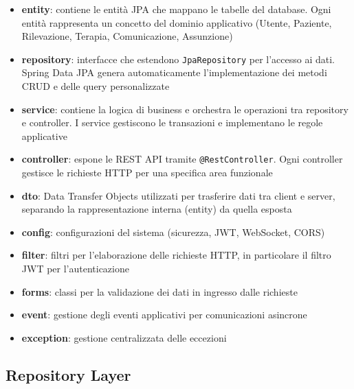 \documentclass{report}
\begin{document}
\begin{itemize}
    \item \textbf{entity}: contiene le entità JPA che mappano le tabelle del database. 
    Ogni entità rappresenta un concetto del dominio applicativo (Utente, Paziente, 
    Rilevazione, Terapia, Comunicazione, Assunzione)
    
    \item \textbf{repository}: interfacce che estendono \texttt{JpaRepository} per 
    l'accesso ai dati. Spring Data JPA genera automaticamente l'implementazione dei 
    metodi CRUD e delle query personalizzate
    
    \item \textbf{service}: contiene la logica di business e orchestra le operazioni 
    tra repository e controller. I service gestiscono le transazioni e implementano 
    le regole applicative
    
    \item \textbf{controller}: espone le REST API tramite \texttt{@RestController}. 
    Ogni controller gestisce le richieste HTTP per una specifica area funzionale
    
    \item \textbf{dto}: Data Transfer Objects utilizzati per trasferire dati tra 
    client e server, separando la rappresentazione interna (entity) da quella esposta
    
    \item \textbf{config}: configurazioni del sistema (sicurezza, JWT, WebSocket, CORS)
    
    \item \textbf{filter}: filtri per l'elaborazione delle richieste HTTP, in particolare 
    il filtro JWT per l'autenticazione
    
    \item \textbf{forms}: classi per la validazione dei dati in ingresso dalle richieste
    
    \item \textbf{event}: gestione degli eventi applicativi per comunicazioni asincrone
    
    \item \textbf{exception}: gestione centralizzata delle eccezioni
\end{itemize}


\subsection{Repository Layer}
\end{document}
